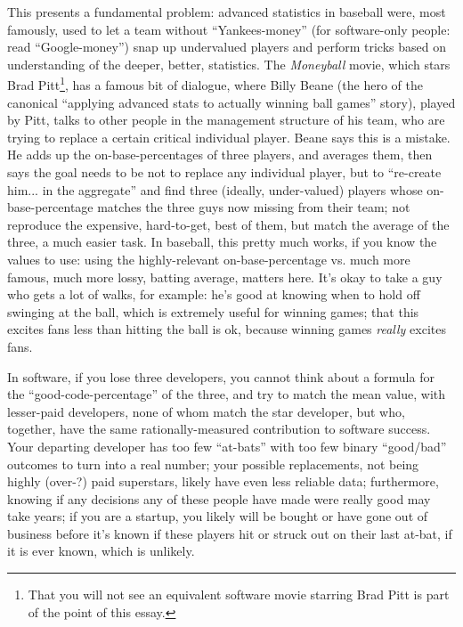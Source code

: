 \documentclass[sigplan,screen]{acmart}
\begin{document}
 This presents a fundamental problem:  advanced statistics in baseball were, most
 famously, used to let a team without ``Yankees-money'' (for software-only
 people: read ``Google-money'') snap up undervalued players and
 perform tricks based on understanding of the deeper, better,
 statistics.  The \emph{Moneyball} movie, which stars Brad
 Pitt\footnote{That you will not see an equivalent software movie starring
   Brad Pitt is part of the point of this essay.}, has a famous bit of
 dialogue, where Billy Beane (the hero of the canonical ``applying
 advanced stats to actually winning ball games'' story), played by Pitt, talks to other
 people in the management structure of his team,
 who are trying to replace a certain critical individual player. Beane
 says this is a mistake.  He adds up the on-base-percentages of three players, and
 averages them, then says the goal needs to be not to replace any
 individual player, but to ``re-create him... in the aggregate'' and
 find three (ideally, under-valued) players whose on-base-percentage matches
 the three guys now missing from their team; not reproduce the
 expensive, hard-to-get, best of them, but match the average of the
 three, a much easier task.  In baseball, this pretty much works, if
 you know the values to use: using the highly-relevant
 on-base-percentage vs. much more famous, much  more lossy, batting
 average, matters here.  It's okay to take a guy who gets a lot of
 walks, for example: he's good at knowing when to hold off swinging at the ball,
 which is extremely useful for winning games; that this excites fans
 less than hitting the ball is ok, because winning games \emph{really}
 excites fans.

 In software, if you lose three developers, you cannot think about a
 formula for the ``good-code-percentage'' of the three, and try to
 match the mean value, with lesser-paid developers, none of whom match
 the star developer, but who, together, have the same
 rationally-measured contribution to software success.  Your departing
 developer has too few ``at-bats'' with too few binary ``good/bad''
 outcomes to turn into a real number; your possible replacements, not
 being highly (over-?) paid superstars, likely have even less reliable data;
 furthermore, knowing if any decisions any of these people have made
 were really good may take years; if you are a startup, you likely
 will be bought or have gone out of business before it's known if
 these players hit or struck out on their last at-bat, if it is ever
 known, which is unlikely.
\end{document}
